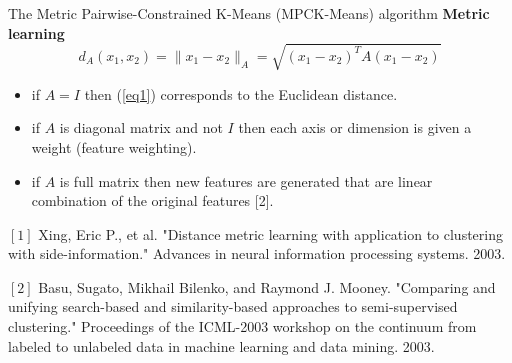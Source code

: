 \documentclass{beamer}
\newlength{\tmpShadow}
\newcommand{\MyShadow}[2]{%
	\settowidth{\tmpShadow}{#1}
	\addtolength{\tmpShadow}{.1em}
	\raisebox{-0.25ex}{\textcolor{gray!70}{#1}}%
	\kern-\tmpShadow%
	\textcolor{#2}{#1}%
}
\newcounter{mycounter}
\newenvironment{noindlist}
{\begin{list}{}{\usecounter{mycounter} \labelsep=0em \labelwidth=0em \leftmargin=0em \itemindent=0em}}
	{\end{list}}
\begin{document}
{\begin{frame}{The Metric Pairwise-Constrained K-Means (MPCK-Means) algorithm}
	\textbf{Metric learning}
	\vspace{3mm}	
	\begin{equation}\label{eq1}
		d_A(x_1,x_2) = \lVert x_1 - x_2 \rVert_A = \sqrt{(x_1-x_2)^T A(x_1-x_2)}
	\end{equation}	
	\vspace{3mm}
	\begin{itemize}[label={\MyShadow{$\bullet$}{blue!80}}]
		\item if $A = I$ then (\ref{eq1}) corresponds to the Euclidean distance.
		\vspace{3mm}
		\item if $A$ is diagonal matrix and not $I$ then each axis or dimension is given a weight (feature weighting).
		\vspace{3mm}
		\item if $A$ is full matrix then new features are generated that are linear combination of the original features [2].
	\end{itemize}
	\vspace{5mm}
	\begin{tiny}
		\begin{noindlist}
			\item $[1]$ Xing, Eric P., et al. "Distance metric learning with application to clustering with side-information." Advances in neural information processing systems. 2003.
			\item $[2]$ Basu, Sugato, Mikhail Bilenko, and Raymond J. Mooney. "Comparing and unifying search-based and similarity-based approaches to semi-supervised clustering." Proceedings of the ICML-2003 workshop on the continuum from labeled to unlabeled data in machine learning and data mining. 2003.
		\end{noindlist}
	\end{tiny}	
\end{frame}

}
\end{document}
